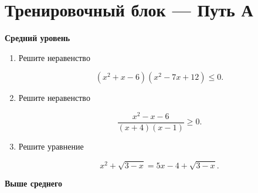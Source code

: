 \documentclass[a4paper,12pt]{article}
\begin{document}

\newpage

\section*{\textcolor{darkaccent}{
Тренировочный блок --- Путь А
}}

\textbf{Средний уровень}

\begin{enumerate}[label=\textbf{\arabic*.}]

\item
Решите неравенство

\[
(x^2+x-6)(x^2-7x+12)\le0.
\]

\item
Решите неравенство

\[
\frac{x^2-x-6}{(x+4)(x-1)}\ge0.
\]

\item
Решите уравнение

\[
x^2+\sqrt{3-x}
=
5x-4+\sqrt{3-x}.
\]

\end{enumerate}

\textbf{Выше среднего}
\end{document}
